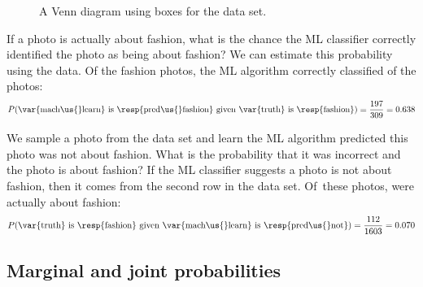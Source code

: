 \begin{figure}[ht]
  \centering
  \caption{A Venn diagram using boxes for the  data set.}
  \label{photoClassifyVenn}
\end{figure}

\begin{examplewrap}
\begin{nexample}{If a photo is actually about fashion,
    what is the chance the ML classifier correctly identified
    the photo as being about fashion?}
  We can estimate this probability using the data.
  Of the \fashAY{} fashion photos,
  the ML algorithm correctly classified \fashYY{} of the photos:
\begin{align*}
P(\text{\var{mach\us{}learn} is \resp{pred\us{}fashion}
    given \var{truth} is \resp{fashion}})
  = \frac{\fashYY{}}{\fashAY{}}
  = 0.638
\end{align*}
\end{nexample}
\end{examplewrap}

\begin{examplewrap}
\begin{nexample}{We sample a photo from the data set
    and learn the ML algorithm predicted this photo
    was not about fashion.
    What is the probability that it was incorrect and
    the photo is about fashion?}
  If the ML classifier suggests a photo is not about fashion,
  then it comes from the second row in the data set.
  Of~these \fashNA{} photos, \fashNY{} were actually
  about fashion:
\begin{align*}
P(\text{\var{truth} is \resp{fashion}
    given \var{mach\us{}learn} is \resp{pred\us{}not}})
  = \frac{\fashNY{}}{\fashNA{}}
  = 0.070
\end{align*}
\end{nexample}
\end{examplewrap}


\D{\newpage}

%
\subsection{Marginal and joint probabilities}
\label{marginalAndJointProbabilities}

